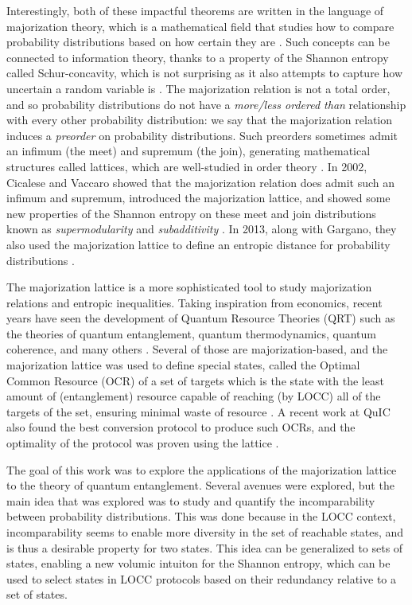 Interestingly, both of these impactful theorems are written in the language of majorization theory, which is a mathematical field that studies how to compare probability distributions based on how certain they are \cite{marshall_inequalities_2011}. Such concepts can be connected to information theory, thanks to a property of the Shannon entropy called Schur-concavity, which is not surprising as it also attempts to capture how uncertain a random variable is \cite{marshall_inequalities_2011, cover_elements_2006}. The majorization relation is not a total order, and so probability distributions do not have a \textit{more/less ordered than} relationship with every other probability distribution: we say that the majorization relation induces a \textit{preorder} on probability distributions. Such preorders sometimes admit an infimum (the meet) and supremum (the join), generating mathematical structures called lattices, which are well-studied in order theory \cite{davey_introduction_2002}. In 2002, Cicalese and Vaccaro showed that the majorization relation does admit such an infimum and supremum, introduced the majorization lattice, and showed some new properties of the Shannon entropy on these meet and join distributions known as \textit{supermodularity} and \textit{subadditivity} \cite{cicalese_supermodularity_2002}. In 2013, along with Gargano, they also used the majorization lattice to define an entropic distance for probability distributions \cite{cicalese_information_2013}.

The majorization lattice is a more sophisticated tool to study majorization relations and entropic inequalities. Taking inspiration from economics, recent years have seen the development of Quantum Resource Theories (QRT) such as the theories of quantum entanglement, quantum thermodynamics, quantum coherence, and many others \cite{chitambar_quantum_2019}. Several of those are majorization-based, and the majorization lattice was used to define special states, called the Optimal Common Resource (OCR) of a set of targets which is the state with the least amount of (entanglement) resource capable of reaching (by LOCC) all of the targets of the set, ensuring minimal waste of resource \cite{bosyk_optimal_2019}. A recent work at QuIC also found the best conversion protocol to produce such OCRs, and the optimality of the protocol was proven using the lattice \cite{deside_probabilistic_2024}.

The goal of this work was to explore the applications of the majorization lattice to the theory of quantum entanglement. Several avenues were explored, but the main idea that was explored was to study and quantify the incomparability between probability distributions. This was done because in the LOCC context, incomparability seems to enable more diversity in the set of reachable states, and is thus a desirable property for two states. This idea can be generalized to sets of states, enabling a new volumic intuiton for the Shannon entropy, which can be used to select states in LOCC protocols based on their redundancy relative to a set of states.

